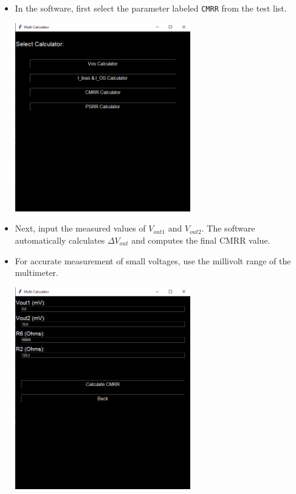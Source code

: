 \documentclass[a4paper,12pt]{article}
\begin{document}
\begin{itemize}
  \item In the software, first select the parameter labeled \texttt{CMRR} from the test list.

  \begin{center}
    \includegraphics[width=0.6\textwidth]{IMAGEs/cmrr_software_select.png}
  \end{center}

  \item Next, input the measured values of \( V_{out1} \) and \( V_{out2} \). The software automatically calculates \( \Delta V_{out} \) and computes the final CMRR value.

  \item For accurate measurement of small voltages, use the millivolt range of the multimeter.

  \begin{center}
    \includegraphics[width=0.6\textwidth]{IMAGEs/cmrr_software_entry.png}
  \end{center}
\end{itemize}
\end{document}
